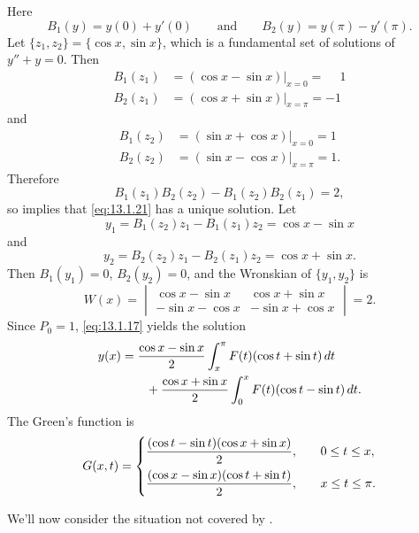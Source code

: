 \begin{solution}
Here
\[
B_{1}(y)=y(0)+y'(0)   \qquad\text{and}\qquad B_{2}(y)=y(\pi)-y'(\pi).
\]
Let $\{z_{1},z_{2}\}=\{\cos x,\sin x\}$, which is a fundamental set of
solutions of $y''+y=0$. Then
\begin{align*}
B_{1}(z_{1})&=(\cos x-\sin x)\big|_{x=0}=\phantom{-}1\\
B_{2}(z_{1})&=(\cos x+\sin x)\big|_{x=\pi}=-1
\end{align*}
and
\begin{align*}
B_{1}(z_{2})&=(\sin x+\cos x)\big|_{x=0}=1\\
B_{2}(z_{2})&=(\sin x-\cos x)\big|_{x=\pi}=1.
\end{align*}
Therefore
\[
B_{1}(z_{1})B_{2}(z_{2})-B_{1}(z_{2})B_{2}(z_{1})=2,
\]
so  implies that \eqref{eq:13.1.21} has a unique
solution. Let
\[
y_{1}=B_{1}(z_{2})z_{1}-B_{1}(z_{1})z_{2}= \cos x-\sin x
\]
 and
\[
y_{2}=B_{2}(z_{2})z_{1}-B_{2}(z_{1})z_{2}=  \cos x+\sin x.
\]
Then $B_{1}(y_{1})=0$, $B_{2}(y_{2})=0$, and the Wronskian of
$\{y_{1},y_{2}\}$ is
\[
W(x)=
\begin{vmatrix}
\cos x-\sin x& \cos x+ \sin x\\
-\sin x-\cos x&-\sin x+\cos x
\end{vmatrix}=2.
\]
Since $P_{0}=1$, \eqref{eq:13.1.17} yields the solution
\begin{align*}
y(x)&=\displaystyle{\frac{\cos x-\sin x}{2}}\int_{x}^{\pi}F(t)(\cos t+\sin t)\,dt\\
&\qquad{}+\displaystyle{\frac{\cos x +\sin x}{2}}\int_{0}^{x}F(t)(\cos t-\sin t)\,dt.
\end{align*}
The Green's function is
\[
G(x,t)=
\begin{cases}
\displaystyle{\frac{(\cos t-\sin t)(\cos x+\sin x)}{2}},&\quad  0\le t\le
x,\\[.1in]
\displaystyle{\frac{(\cos x-\sin x)(\cos t+\sin t)}{2}},&\quad x\le t\le \pi.
\end{cases}
\]
\end{solution}

We'll now consider the situation not covered by .

